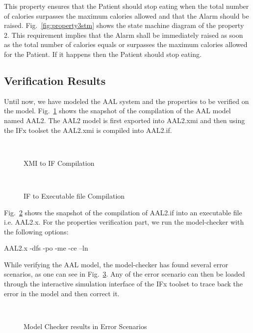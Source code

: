 \documentclass[a4paper,twoside]{article}
\begin{document}
 
 
This property ensures that the Patient should stop eating when the total number of calories surpasses the maximum calories allowed and that the Alarm should be raised.
Fig.~\ref{fig:property3stm} shows the state machine diagram of the property 2. This requirement implies that the Alarm shall be immediately raised as soon as the total number of calories equals or surpasses the maximum calories allowed for the Patient. If it happens then the Patient should stop eating.  

\subsection{Verification Results}
Until now, we have modeled the AAL system and the properties to be verified on the model. Fig.~\ref{fig:xmi2if} shows the snapshot of the compilation of the AAL model named AAL2. The AAL2 model is first exported into AAL2.xmi and then using the IFx toolset the AAL2.xmi is compiled into AAL2.if.

\begin{figure}[!h]
  \vspace{8cm}~
  \centering
  {}
  \caption{XMI to IF Compilation}
  \label{fig:xmi2if}
 \end{figure}
 
 
\begin{figure}[!h]
  \vspace{8cm}~
  \centering
  {}
  \caption{IF to Executable file Compilation}
  \label{fig:if2exe}
 \end{figure}
 
Fig.~\ref{fig:if2exe} shows the snapshot of the compilation of AAL2.if into an executable file i.e. AAL2.x. 
For the properties verification part, we run the model-checker with the following options:

AAL2.x -dfs -po -me -ce –ln

While verifying the AAL model, the model-checker has found several error scenarios, as one can see in Fig.~\ref{fig:errorstate}.  Any of the error scenario can then be loaded through the interactive simulation interface of the IFx toolset to trace back the error in the model and then correct it. 

\begin{figure}[!h]
  \vspace{8cm}~
  \centering
  {}
  \caption{Model Checker results in Error Scenarios}
  \label{fig:errorstate}
 \end{figure}
\end{document}
